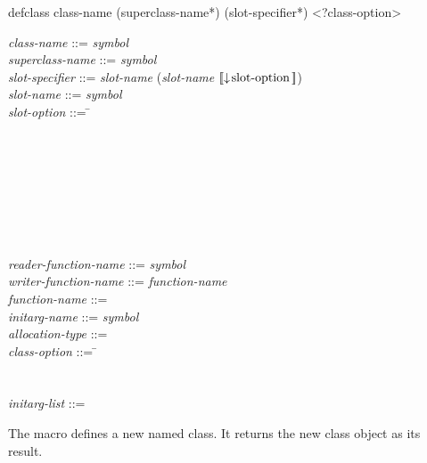 \begin{defmac}
defclass class-name ({superclass-name}*)
         ({slot-specifier}*) <?class-option>

\begin{tabbing}
\emph{class-name\/} ::= \emph{symbol\/} \\
\emph{superclass-name\/} ::= \emph{symbol\/}\\
\emph{slot-specifier\/} ::= \emph{slot-name\/} {\Mor} (\emph{slot-name\/}  $\lbrack\!\lbrack\downarrow\!\hbox{slot-option}\,\rbrack\!\rbrack$)\\
\emph{slot-name\/} ::= \emph{symbol\/}\\
\emph{slot-option\/} ::= \= \\
\Mor~ \\
\Mor~ \\
\Mor~ \\
\Mor~ \\
\Mor~ \\
\Mor~ \\
\Mor~
\end{tabbing}
\begin{tabbing}
\emph{reader-function-name\/} ::= \emph{symbol\/}\\
\emph{writer-function-name\/} ::= \emph{function-name\/}\\
\emph{function-name\/} ::= \\
\emph{initarg-name\/} ::= \emph{symbol\/}\\
\emph{allocation-type\/} ::= \\
\emph{class-option\/} ::= \= \\
\Mor~ \\
\Mor~  \\
\emph{initarg-list\/} ::= 
\end{tabbing}
The macro  defines a new named class.  It returns the new class
object as its result.


\end{defmac}

